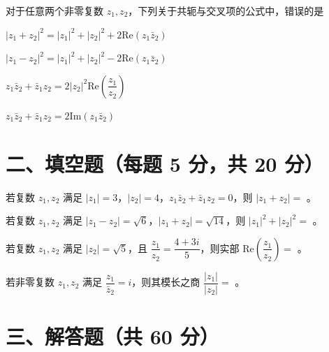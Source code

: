 \documentclass{exam-zh}
\begin{document}
\begin{question}[points=5]
  对于任意两个非零复数 $z_1, z_2$，下列关于共轭与交叉项的公式中，错误的是
  \begin{choices}
    \item $|z_1 + z_2|^2 = |z_1|^2 + |z_2|^2 + 2\mathrm{Re}(z_1\bar{z}_2)$
    \item $|z_1 - z_2|^2 = |z_1|^2 + |z_2|^2 - 2\mathrm{Re}(z_1\bar{z}_2)$
    \item $z_1\bar{z}_2 + \bar{z}_1z_2 = 2|z_2|^2\mathrm{Re}\left(\dfrac{z_1}{z_2}\right)$
    \item $z_1\bar{z}_2 + \bar{z}_1z_2 = 2\mathrm{Im}(z_1\bar{z}_2)$
  \end{choices}
\end{question}


\section*{二、填空题（每题 5 分，共 20 分）}


\begin{question}[points=5]
  若复数 $z_1, z_2$ 满足 $|z_1| = 3$，$|z_2| = 4$，$z_1\bar{z}_2 + \bar{z}_1z_2 = 0$，则 $|z_1 + z_2| = $ \fillin。
  \fillin
\end{question}



\begin{question}[points=5]
  若复数 $z_1, z_2$ 满足 $|z_1 - z_2| = \sqrt{6}$，$|z_1 + z_2| = \sqrt{14}$，则 $|z_1|^2 + |z_2|^2 = $ \fillin。
  \fillin
\end{question}



\begin{question}[points=5]
  若复数 $z_1, z_2$ 满足 $|z_2| = \sqrt{5}$，且 $\dfrac{z_1}{z_2} = \dfrac{4+3i}{5}$，则实部 $\mathrm{Re}\left(\dfrac{z_1}{z_2}\right) = $ \fillin。
  \fillin
\end{question}



\begin{question}[points=5]
  若非零复数 $z_1, z_2$ 满足 $\dfrac{z_1}{\bar{z}_2} = i$，则其模长之商 $\dfrac{|z_1|}{|z_2|} = $ \fillin。
  \fillin
\end{question}


\section*{三、解答题（共 60 分）}
\end{document}
